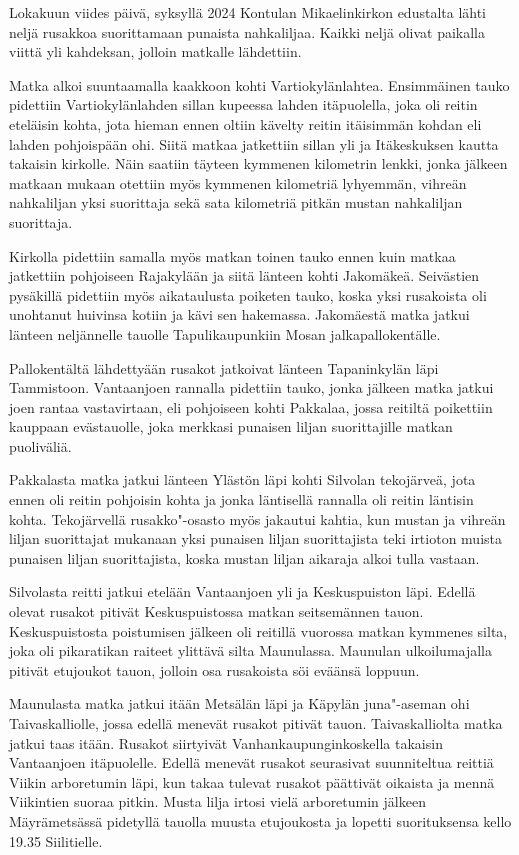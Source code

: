 \begin{multicols}{2}
\columnbreak

\noindent Lokakuun viides päivä, syksyllä 2024 Kontulan Mikaelinkirkon 
edustalta lähti neljä rusakkoa suorittamaan punaista nahkaliljaa. Kaikki 
neljä olivat paikalla viittä yli kahdeksan, jolloin matkalle lähdettiin. 

Matka alkoi suuntaamalla kaakkoon kohti Vartiokylänlahtea. Ensimmäinen tauko 
pidettiin Vartiokylänlahden sillan kupeessa lahden itäpuolella, joka oli 
reitin eteläisin kohta, jota hieman ennen oltiin kävelty reitin itäisimmän 
kohdan eli lahden pohjoispään ohi. Siitä matkaa jatkettiin sillan yli ja 
Itäkeskuksen kautta takaisin kirkolle. Näin saatiin täyteen kymmenen 
kilometrin lenkki, jonka jälkeen matkaan mukaan otettiin myös kymmenen 
kilometriä lyhyemmän, vihreän nahkaliljan yksi suorittaja sekä sata 
kilometriä pitkän mustan nahkaliljan suorittaja. 

Kirkolla pidettiin samalla myös matkan toinen tauko ennen kuin matkaa 
jatkettiin pohjoiseen Rajakylään ja siitä länteen kohti Jakomäkeä. 
Seivästien pysäkillä pidettiin myös aikataulusta poiketen tauko, koska yksi 
rusakoista oli unohtanut huivinsa kotiin ja kävi sen hakemassa. Jakomäestä 
matka jatkui länteen neljännelle tauolle Tapulikaupunkiin Mosan 
jalkapallokentälle.

Pallokentältä lähdettyään rusakot jatkoivat länteen Tapaninkylän läpi 
Tammistoon. Vantaanjoen rannalla pidettiin tauko, jonka jälkeen matka jatkui 
joen rantaa vastavirtaan, eli pohjoiseen kohti Pakkalaa, jossa reitiltä 
poikettiin kauppaan evästauolle, joka merkkasi punaisen liljan suorittajille 
matkan puoliväliä.

Pakkalasta matka jatkui länteen Ylästön läpi kohti Silvolan tekojärveä, 
jota ennen oli reitin pohjoisin kohta ja jonka läntisellä rannalla oli reitin 
läntisin kohta. Tekojärvellä rusakko"-osasto myös jakautui kahtia, kun 
mustan ja vihreän liljan suorittajat mukanaan yksi punaisen liljan 
suorittajista teki irtioton muista punaisen liljan suorittajista, koska mustan 
liljan aikaraja alkoi tulla vastaan. 

Silvolasta reitti jatkui etelään Vantaanjoen yli ja Keskuspuiston läpi. 
Edellä olevat rusakot pitivät Keskuspuistossa matkan seitsemännen tauon. 
Keskuspuistosta poistumisen jälkeen oli reitillä vuorossa matkan kymmenes 
silta, joka oli pikaratikan raiteet ylittävä silta Maunulassa. Maunulan 
ulkoilumajalla pitivät etujoukot tauon, jolloin osa rusakoista söi eväänsä 
loppuun.

Maunulasta matka jatkui itään Metsälän läpi ja Käpylän juna"-aseman ohi 
Taivaskalliolle, jossa edellä menevät rusakot pitivät tauon. Taivaskalliolta 
matka jatkui taas itään. Rusakot siirtyivät Vanhankaupunginkoskella takaisin 
Vantaanjoen itäpuolelle. Edellä menevät rusakot seurasivat suunniteltua 
reittiä Viikin arboretumin läpi, kun takaa tulevat rusakot päättivät 
oikaista ja mennä Viikintien suoraa pitkin. Musta lilja irtosi vielä 
arboretumin jälkeen Mäyrämetsässä pidetyllä tauolla muusta etujoukosta ja 
lopetti suorituksensa kello 19.35 Siilitielle.


\end{multicols}

